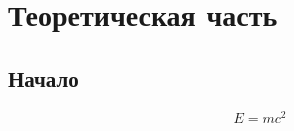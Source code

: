 \chapter{Теоретическая часть}
\label{cha:theory}

\section{Начало}

\blindtext

\begin{equation}
    E=mc^2
\end{equation}
